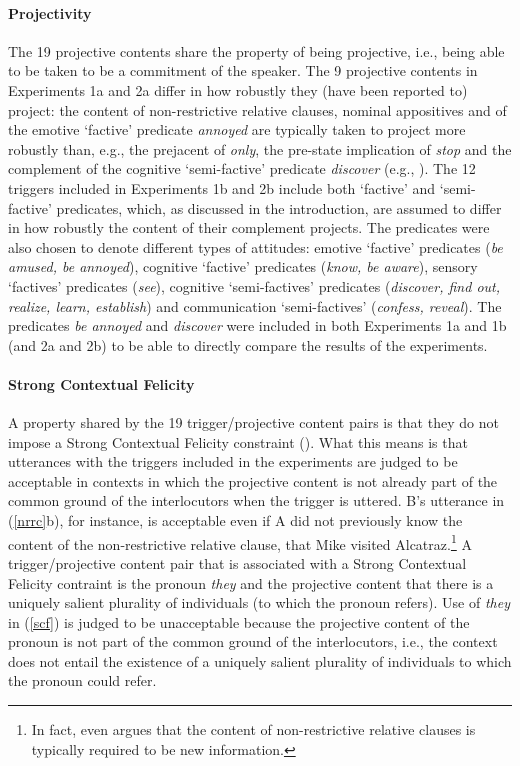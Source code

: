 \documentclass[11pt,fleqn]{article}
\newcommand{\6}{\mbox{$[\hspace*{-.6mm}[$}}
\newcommand{\9}{\mbox{$]\hspace*{-.6mm}]$}}
\begin{document}
\paragraph{Projectivity} The 19 projective contents share the property of being projective, i.e., being able to be taken to be a commitment of the speaker. The 9 projective contents in Experiments 1a and 2a differ in how robustly they (have been reported to) project: the content of non-restrictive relative clauses, nominal appositives and of the emotive `factive' predicate {\em annoyed} are typically taken to project more robustly than, e.g., the prejacent of {\em only}, the pre-state implication of {\em stop} and the complement of the cognitive `semi-factive' predicate {\em discover} (e.g., \citealt{karttunen71b,simons01,potts05,abusch10,beaver-belly}). The 12 triggers included in Experiments 1b and 2b include both `factive' and `semi-factive' predicates, which, as discussed in the introduction, are assumed to differ in how robustly the content of their complement projects. The predicates were also chosen to denote different types of attitudes: emotive `factive' predicates ({\em be amused, be annoyed}), cognitive `factive' predicates ({\em know, be aware}), sensory `factives' predicates ({\em see}), cognitive `semi-factives' predicates ({\em discover, find out, realize, learn, establish}) and communication `semi-factives' ({\em confess, reveal}). The predicates {\em be annoyed} and {\em discover} were included in both Experiments 1a and 1b (and 2a and 2b) to be able to directly compare the results of the experiments.

\paragraph{Strong Contextual Felicity} A property shared by the 19 trigger/projective content pairs is that they do not impose a Strong Contextual Felicity constraint (\citealt{brst-lang11}). What this means is that utterances with the triggers included in the experiments are judged to be acceptable in contexts in which the projective content is not already part of the common ground of the interlocutors when the trigger is uttered. B's utterance in (\ref{nrrc}b), for instance, is acceptable even if A did not previously know the content of the non-restrictive relative clause, that Mike visited Alcatraz.\footnote{In fact, \citealt{potts05} even argues that the content of non-restrictive relative clauses is typically required to be new information.} A trigger/projective content pair that is associated with a Strong Contextual Felicity contraint is the pronoun {\em they} and the projective content that there is a uniquely salient plurality of individuals (to which the pronoun refers). Use of {\em they} in (\ref{scf}) is judged to be unacceptable because the projective content of the pronoun is not part of the common ground of the interlocutors, i.e., the context does not entail the existence of a uniquely salient plurality of individuals to which the pronoun could refer. 
\end{document}
